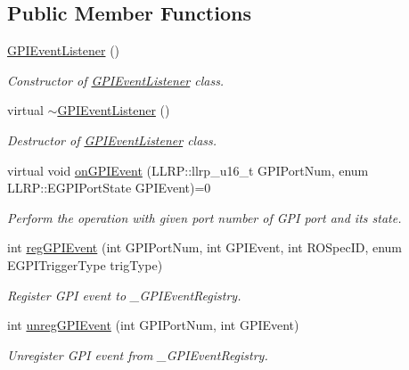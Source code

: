 \subsection*{Public Member Functions}
\begin{DoxyCompactItemize}
\item 
\hyperlink{class_e_l_f_i_n_1_1_g_p_i_event_listener_a663349d73ed9d1348f970bddb342901d}{G\-P\-I\-Event\-Listener} ()
\begin{DoxyCompactList}\small\item\em Constructor of \hyperlink{class_e_l_f_i_n_1_1_g_p_i_event_listener}{G\-P\-I\-Event\-Listener} class. \end{DoxyCompactList}\item 
virtual \hyperlink{class_e_l_f_i_n_1_1_g_p_i_event_listener_a16d54d415de14ebd57211f6789ee1a3b}{$\sim$\-G\-P\-I\-Event\-Listener} ()
\begin{DoxyCompactList}\small\item\em Destructor of \hyperlink{class_e_l_f_i_n_1_1_g_p_i_event_listener}{G\-P\-I\-Event\-Listener} class. \end{DoxyCompactList}\item 
virtual void \hyperlink{class_e_l_f_i_n_1_1_g_p_i_event_listener_a5afdbda5a841643ca219f1e4bd3cad4f}{on\-G\-P\-I\-Event} (L\-L\-R\-P\-::llrp\-\_\-u16\-\_\-t G\-P\-I\-Port\-Num, enum L\-L\-R\-P\-::\-E\-G\-P\-I\-Port\-State G\-P\-I\-Event)=0
\begin{DoxyCompactList}\small\item\em Perform the operation with given port number of G\-P\-I port and its state. \end{DoxyCompactList}\item 
int \hyperlink{class_e_l_f_i_n_1_1_g_p_i_event_listener_aca1758c1f28701458725f318ac21a9de}{reg\-G\-P\-I\-Event} (int G\-P\-I\-Port\-Num, int G\-P\-I\-Event, int R\-O\-Spec\-I\-D, enum E\-G\-P\-I\-Trigger\-Type trig\-Type)
\begin{DoxyCompactList}\small\item\em Register G\-P\-I event to \-\_\-\-G\-P\-I\-Event\-Registry. \end{DoxyCompactList}\item 
int \hyperlink{class_e_l_f_i_n_1_1_g_p_i_event_listener_a00674b0da3cce658f584758d13c9201b}{unreg\-G\-P\-I\-Event} (int G\-P\-I\-Port\-Num, int G\-P\-I\-Event)
\begin{DoxyCompactList}\small\item\em Unregister G\-P\-I event from \-\_\-\-G\-P\-I\-Event\-Registry. \end{DoxyCompactList}\end{DoxyCompactItemize}
